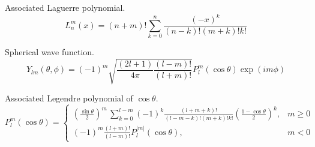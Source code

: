 Associated Laguerre polynomial.
\begin{equation*}
L_n^m(x)=(n+m)!\sum_{k=0}^n\frac{(-x)^k}{(n-k)!(m+k)!k!}
\end{equation*}

Spherical wave function.
\begin{equation*}
Y_{lm}(\theta,\phi)=(-1)^m
\sqrt{\frac{(2l+1)}{4\pi}
\frac{(l-m)!}{(l+m)!}}
P_l^m(\cos\theta)\exp(im\phi)
\end{equation*}

Associated Legendre polynomial of $\cos\theta$.
\begin{equation*}
P_l^m(\cos\theta)=\begin{cases}
\displaystyle
\left(\frac{\sin\theta}{2}\right)^m\,\sum_{k=0}^{l-m}
(-1)^k\frac{(l+m+k)!}{(l-m-k)!(m+k)!k!}
\left(\frac{1-\cos\theta}{2}\right)^k, & m\ge0
\\[3ex]
\displaystyle
(-1)^m\frac{(l+m)!}{(l-m)!}P_l^{|m|}(\cos\theta), & m<0
\end{cases}
\end{equation*}


